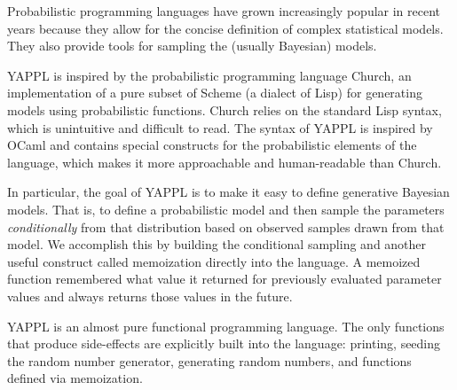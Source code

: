 Probabilistic programming languages have grown increasingly popular in recent years because they allow for the concise definition of complex statistical models. They also provide tools for sampling the (usually Bayesian) models. 

YAPPL is inspired by the probabilistic programming language Church, an implementation of a pure subset of Scheme (a dialect of Lisp) for generating models using probabilistic functions. Church relies on the standard Lisp syntax, which is unintuitive and difficult to read. The syntax of YAPPL is inspired by OCaml and contains special constructs for the probabilistic elements of the language, which makes it more approachable and human-readable than Church. 

In particular, the goal of YAPPL is to make it easy to define generative Bayesian models. That is, to define a probabilistic model and then sample the parameters {\em conditionally} from that distribution based on observed samples drawn from that model. We accomplish this by building the conditional sampling and another useful construct called memoization directly into the language. A memoized function remembered what value it returned for previously evaluated parameter values and always returns those values in the future.  

YAPPL is an almost pure functional programming language. The only functions that produce side-effects are explicitly built into the language: printing, seeding the random number generator, generating random numbers, and functions defined via memoization. 
